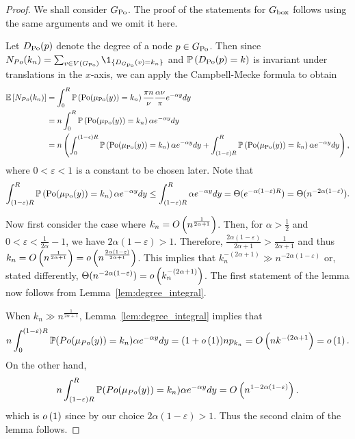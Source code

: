 \begin{proof}
We shall consider $G_{{\mathrm{Po}}}$. The proof of the statements for $G_{\mathrm{box}}$ follows using the same arguments and we omit it here. 

Let $D_{{\mathrm{Po}}}(p)$ denote the degree of a node $p \in G_{{\mathrm{Po}}}$. Then since $N_{Po}(k_n)= \sum_{v\in V(\GPo)}\1_{\{D_{\GPo}(v)=k_n\}}$ and $\mathbb{P}\left(D_{{\mathrm{Po}}}(p) = k\right)$ is invariant under translations in the $x$-axis, we can apply the Campbell-Mecke formula to obtain
\begin{align*}
	\mathbb{E}\left[N_{Po}(k_n)\right] 
	&= \int_0^R \mathbb{P}\left({\mathrm{Po}}(\mu_{{\mathrm{Po}}}(y)) = k_n\right) \frac{\pi n}{\nu}\frac{\alpha \nu}{\pi} e^{-\alpha y}dy \\
	&=n \int_0^R \mathbb{P}\left({\mathrm{Po}}(\mu_{{\mathrm{Po}}}(y)) = k_n\right) \alpha e^{-\alpha y}dy \\
	&=n\left( \int_0^{(1-\epsilon)R} \mathbb{P}\left({\mathrm{Po}}(\mu_{{\mathrm{Po}}}(y)) = k_n\right) \alpha e^{-\alpha y}dy
		+ \int_{(1-\varepsilon)R}^R \mathbb{P}\left({\mathrm{Po}}(\mu_{{\mathrm{Po}}}(y)) = k_n\right) \alpha e^{-\alpha y}dy \right),
\end{align*}
where $0 < \varepsilon < 1$ is a constant to be chosen later.
Note that
\begin{align*}
	\int_{(1-\varepsilon)R}^R \Prob{\Po(\mu_{\Po}(y)) = k_n}\alpha e^{-\alpha y}dy 
	\le \int_{(1-\varepsilon)R}^R \alpha e^{-\alpha y}dy 
	= \Theta(e^{-\alpha (1-\varepsilon) R}) = \Theta(n^{-2\alpha(1-\varepsilon)}) .%
\end{align*}

Now first consider the case where $k_n = O\left(n^{\frac{1}{2\alpha + 1}}\right)$. Then, for $\alpha > \frac{1}{2}$ and $0 < \varepsilon < \frac{1}{2\alpha} - 1$, we have $2\alpha(1-\varepsilon)>1$. Therefore, $\frac{2\alpha (1-\varepsilon)}{2\alpha+1}>\frac{1}{2\alpha+1}$ and thus
$k_n = O\left(n^{\frac{1}{2\alpha+1}}\right) = o\left(n^{\frac{2\alpha(1-\varepsilon)}{2\alpha+1}}\right)$. This implies that $k_n^{-(2\alpha+1)} \gg n^{-2\alpha(1-\varepsilon)}$ or, stated differently, $\Theta(n^{-2\alpha(1-\varepsilon)}) = o\left(k_n^{-(2\alpha+1)}\right)$. The first statement of the lemma now follows from Lemma~\ref{lem:degree_integral}.

When $k_n \gg n^{\frac{1}{2\alpha + 1}}$, Lemma~\ref{lem:degree_integral} implies that
\[
	n \int_0^{(1-\varepsilon)R} \mathbb{P}(Po(\mu_{Po}(y))=k_n) \alpha e^{-\alpha y}dy
	= (1+o\left(1\right)) n p_{k_n} = O\left(n k^{-(2\alpha + 1}\right) = o\left(1\right).
\]
On the other hand,
\[
	n \int_{(1-\varepsilon)R}^R \mathbb{P}(Po(\mu_{Po}(y))=k_n) \alpha e^{-\alpha y}dy = O\left(n^{1 - 2\alpha(1-\varepsilon)}\right).
\]
which is $o\left(1\right)$ since by our choice $2\alpha(1-\varepsilon) > 1$. Thus the second claim of the lemma follows.
\end{proof}

